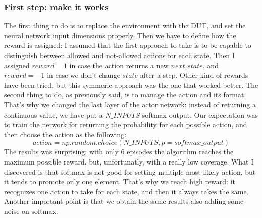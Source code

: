 \documentclass{article}
\begin{document}
\subsubsection*{First step: make it works}
The first thing to do is to replace the environment with the DUT, and set the neural network input dimensions properly. Then we have to define how the reward is assigned: I assumed that the first approach to take is to be capable to distinguish between allowed and not-allowed actions for each state. Then I assigned $reward = 1$ in case the action returns a new $next\_state$, and $reward = -1$ in case we don't change $state$ after a step. Other kind of rewards have been tried, but this symmeric approach was the one that worked better. The second thing to do, as previously said, is to manage the action and its format. That's why we changed the last layer of the actor network: instead of returning a continuous value, we have put a $N\_INPUTS$  softmax output. Our expectation was to train the network for returning the probability for each possible action, and then choose the action as the following:
$$
action = np.random.choice(N\_INPUTS, p = softmax\_output)
$$
The results was surprising: with only 6 episodes the algorithm reaches the maximum possible reward, but, unfortunatly, with a really low coverage. What I discovered is that softmax is not good for setting multiple most-likely action, but it tends to promote only one element. That's why we reach high reward: it recognizes one action to take for each state, and then it always takes the same. Another important point is that we obtain the same results also adding some noise on softmax.
\end{document}

